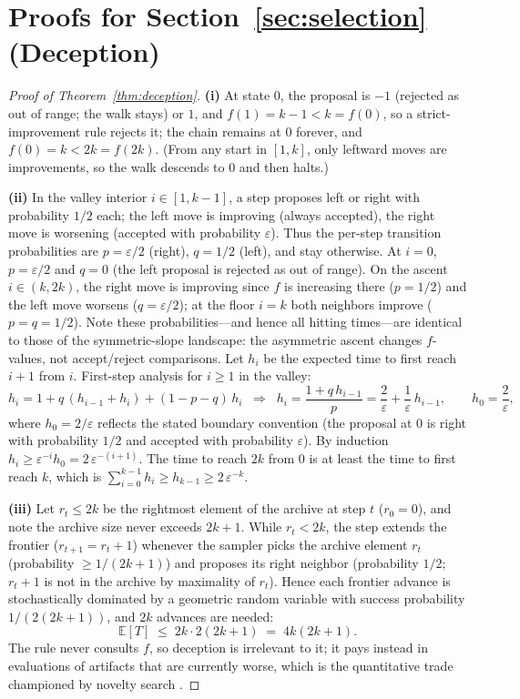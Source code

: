 \documentclass{article}
\theoremstyle{plain}
\theoremstyle{definition}
\theoremstyle{remark}
\newcommand{\E}{\mathbb{E}}
\newcommand{\eps}{\varepsilon}
\begin{document}
\section{Proofs for Section~\ref{sec:selection} (Deception)}
\label{app:deception}

\begin{proof}[Proof of Theorem~\ref{thm:deception}]
\textbf{(i)} At state $0$, the proposal is $-1$ (rejected as out of range; the walk stays) or $1$, and $f(1) = k - 1 < k = f(0)$, so a strict-improvement rule rejects it; the chain remains at $0$ forever, and $f(0) = k < 2k = f(2k)$. (From any start in $[1, k]$, only leftward moves are improvements, so the walk descends to $0$ and then halts.)

\textbf{(ii)} In the valley interior $i \in [1, k-1]$, a step proposes left or right with probability $1/2$ each; the left move is improving (always accepted), the right move is worsening (accepted with probability $\eps$). Thus the per-step transition probabilities are $p = \eps/2$ (right), $q = 1/2$ (left), and stay otherwise. At $i = 0$, $p = \eps/2$ and $q = 0$ (the left proposal is rejected as out of range). On the ascent $i \in (k, 2k)$, the right move is improving since $f$ is increasing there ($p = 1/2$) and the left move worsens ($q = \eps/2$); at the floor $i = k$ both neighbors improve ($p = q = 1/2$). Note these probabilities---and hence all hitting times---are identical to those of the symmetric-slope landscape: the asymmetric ascent changes $f$-values, not accept/reject comparisons. Let $h_i$ be the expected time to first reach $i+1$ from $i$. First-step analysis for $i \ge 1$ in the valley:
\[
h_i = 1 + q\,(h_{i-1} + h_i) + (1 - p - q)\,h_i
\;\;\Longrightarrow\;\;
h_i = \frac{1 + q\, h_{i-1}}{p} = \frac{2}{\eps} + \frac{1}{\eps}\, h_{i-1},
\qquad h_0 = \frac{2}{\eps},
\]
where $h_0 = 2/\eps$ reflects the stated boundary convention (the proposal at $0$ is right with probability $1/2$ and accepted with probability $\eps$). By induction $h_i \ge \eps^{-i} h_0 = 2\,\eps^{-(i+1)}$. The time to reach $2k$ from $0$ is at least the time to first reach $k$, which is $\sum_{i=0}^{k-1} h_i \ge h_{k-1} \ge 2\,\eps^{-k}$.

\textbf{(iii)} Let $r_t \le 2k$ be the rightmost element of the archive at step $t$ ($r_0 = 0$), and note the archive size never exceeds $2k+1$. While $r_t < 2k$, the step extends the frontier ($r_{t+1} = r_t + 1$) whenever the sampler picks the archive element $r_t$ (probability $\ge 1/(2k+1)$) and proposes its right neighbor (probability $1/2$; $r_t+1$ is not in the archive by maximality of $r_t$). Hence each frontier advance is stochastically dominated by a geometric random variable with success probability $1/(2(2k+1))$, and $2k$ advances are needed:
\[
\E[T] \;\le\; 2k \cdot 2(2k+1) \;=\; 4k(2k+1).
\]
The rule never consults $f$, so deception is irrelevant to it; it pays instead in evaluations of artifacts that are currently worse, which is the quantitative trade championed by novelty search \citep{lehman2011abandoning}.
\end{proof}
\end{document}
